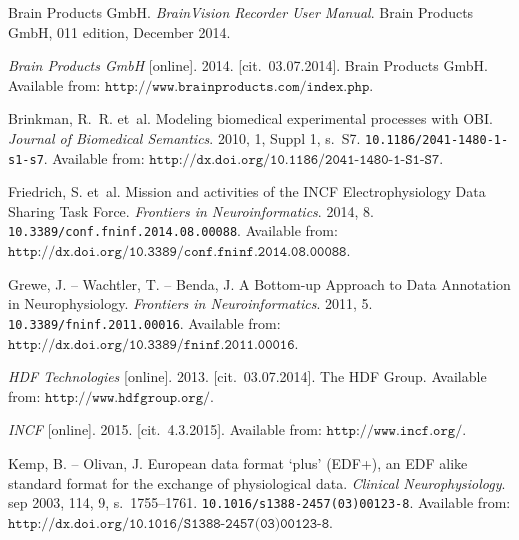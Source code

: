 \documentclass[conference]{IEEEtran}
\begin{document}
\begin{thebibliography}{1}
Brain Products GmbH.
\newblock \emph{BrainVision Recorder User Manual}.
\newblock Brain Products GmbH, 011 edition, December 2014.

\emph{Brain Products GmbH} [online]. 2014. [cit.~03.07.2014].
Brain Products GmbH.
\newblock Available from: $\texttt{{http://www.brainproducts.com/index.php}}$.



{\sc Brinkman}, R.~R. et~al.
\newblock Modeling biomedical experimental processes with {OBI}.
\newblock \emph{Journal of Biomedical Semantics}. 2010, 1, Suppl 1, s.~S7.
\newblock \texttt{10.1186/2041-1480-1-s1-s7}.
\newblock Available from:
$\texttt{{http://dx.doi.org/10.1186/2041-1480-1-S1-S7}}$.



{\sc Friedrich}, S. et~al.
\newblock Mission and activities of the {INCF} Electrophysiology Data Sharing
Task Force.
\newblock \emph{Frontiers in Neuroinformatics}. 2014, 8.
\newblock \texttt{10.3389/conf.fninf.2014.08.00088}.
\newblock Available from:
$\texttt{{http://dx.doi.org/10.3389/conf.fninf.2014.08.00088}}$.



{\sc Grewe}, J. -- {\sc Wachtler}, T. -- {\sc Benda}, J.
\newblock A Bottom-up Approach to Data Annotation in Neurophysiology.
\newblock \emph{Frontiers in Neuroinformatics}. 2011, 5.
\newblock \texttt{10.3389/fninf.2011.00016}.
\newblock Available from:
$\texttt{{http://dx.doi.org/10.3389/fninf.2011.00016}}$.

\emph{HDF Technologies} [online]. 2013. [cit.~03.07.2014]. The HDF Group.
\newblock Available from: $\texttt{{http://www.hdfgroup.org/}}$.

\emph{INCF} [online]. 2015. [cit.~4.3.2015].
\newblock Available from: $\texttt{{http://www.incf.org/}}$.




{\sc Kemp}, B. -- {\sc Olivan}, J.
\newblock European data format `plus' (EDF+), an {EDF} alike standard format
for the exchange of physiological data.
\newblock \emph{Clinical Neurophysiology}. sep 2003, 114, 9, s.~1755--1761.
\newblock \texttt{10.1016/s1388-2457(03)00123-8}.
\newblock Available from:
$\texttt{{http://dx.doi.org/10.1016/S1388-2457(03)00123-8}}$.





\end{thebibliography}
\end{document}
